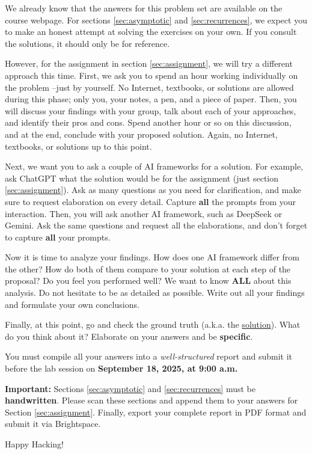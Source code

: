 \documentclass[12pt]{article}
\begin{document}
We already know that the answers for this problem set are available on the course webpage. For sections \ref{sec:asymptotic} and \ref{sec:recurrences}, we expect you to make an honest attempt at solving the exercises on your own. If you consult the solutions, it should only be for reference.

However, for the assignment in section \ref{sec:assignment}, we will try a different approach this time. First, we ask you to spend an hour working individually on the problem --just by yourself. No Internet, textbooks, or solutions are allowed during this phase; only you, your notes, a pen, and a piece of paper. Then, you will discuss your findings with your group, talk about each of your approaches, and identify their pros and cons. Spend another hour or so on this discussion, and at the end, conclude with your proposed solution. Again, no Internet, textbooks, or solutions up to this point.

Next, we want you to ask a couple of AI frameworks for a solution. For example, ask ChatGPT what the solution would be for the assignment (just section \ref{sec:assignment}). Ask as many questions as you need for clarification, and make sure to request elaboration on every detail. Capture \textbf{all} the prompts from your interaction. Then, you will ask another AI framework, such as DeepSeek or Gemini. Ask the same questions and request all the elaborations, and don’t forget to capture \textbf{all} your prompts.

Now it is time to analyze your findings. How does one AI framework differ from the other? How do both of them compare to your solution at each step of the proposal? Do you feel you performed well?  We want to know \textbf{ALL} about this analysis. Do not hesitate to be as detailed as possible. Write out all your findings and formulate your own conclusions.

Finally, at this point, go and check the ground truth (a.k.a. the \href{https://ocw.mit.edu/courses/6-046j-design-and-analysis-of-algorithms-spring-2015/resources/solutions-to-problem-set-1/}{solution}). What do you think about it? Elaborate on your answers and be \textbf{specific}.

You must compile all your answers into a \textit{well-structured} report and submit it before the lab session on \textbf{September 18, 2025, at 9:00 a.m.}

\textbf{Important:} Sections \ref{sec:asymptotic} and \ref{sec:recurrences} must be \textbf{\large handwritten}. Please scan these sections and append them to your answers for Section \ref{sec:assignment}. Finally, export your complete report in PDF format and submit it via Brightspace\texttrademark.

\vspace{5mm}
Happy Hacking! 
\end{document}
